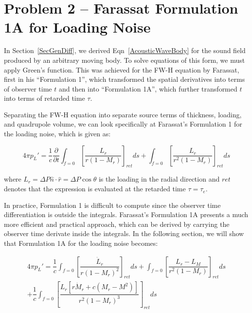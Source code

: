 \documentclass[]{aiaa-tc}%
\begin{document}
\section{Problem 2 -- Farassat Formulation 1A for Loading Noise} \label{SecFarassat}

In Section~\ref{SecGenDiff}, we derived Eqn~\ref{AcousticWaveBody} for the sound field produced by an arbitrary moving body.  To solve equations of this form, we must apply Green's function.  This was achieved for the FW-H equation by Farassat, first in his ``Formulation 1'', which transformed the spatial derivatives into terms of observer time $t$ and then into ``Formulation 1A'', which further transformed $t$ into terms of retarded time $\tau$.

Separating the FW-H equation into separate source terms of thickness, loading, and quadrupole volume, we can look specifically at Farassat’s Formulation 1 for the loading noise, which is given as:

\begin{equation} \label{FarassatForm1Loading}
\boxed{4\pi p_{L}' = \dfrac{1}{c} \dfrac{\partial}{\partial t}
      \int_{f=0} \left[ \dfrac{L_r}{r   (1 - M_r)} \right]_{ret} ds
    + \int_{f=0} \left[ \dfrac{L_r}{r^2 (1 - M_r)} \right]_{ret} ds}
\end{equation}


\noindent where $L_r = \Delta P \hat{n} \cdot \hat{r} = \Delta P \cos\theta$ is the loading in the radial direction and $ret$ denotes that the expression is evaluated at the retarded time $\tau=\tau_e$.

In practice, Formulation 1 is difficult to compute since the observer time differentiation is outside the integrals. Farassat's Formulation 1A presents a much more efficient and practical approach, which can be derived by carrying the observer time derivate inside the integrals. In the following section, we will show that Formulation 1A for the loading noise becomes:

\begin{equation} \label{FarassatForm1ALoadingEx}
\begin{split}
4\pi p_{L}' = \dfrac{1}{c}
      \int_{f=0} \left[ \dfrac{\dot{L}_r}{r (1 - M_r)^2} \right]_{ret} ds
    + \int_{f=0} \left[ \dfrac{L_r - L_M}{r^2 (1 - M_r)} \right]_{ret} ds \\
+ \dfrac{1}{c} \int_{f=0} \left[
    \dfrac{L_r[r \dot{M}_r + c(M_r - M^2)] }{r^2 (1 - M_r)^3} \right]_{ret} ds
\end{split}
\end{equation}
\end{document}
